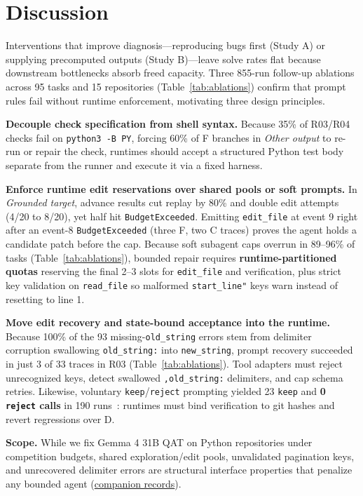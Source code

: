 \section{Discussion}
Interventions that improve diagnosis---reproducing bugs first (Study A) or supplying precomputed outputs (Study B)---leave solve rates flat because downstream bottlenecks absorb freed capacity. Three 855-run follow-up ablations across 95 tasks and 15 repositories (Table~\ref{tab:ablations}) confirm that prompt rules fail without runtime enforcement, motivating three design principles.

\begin{table}[htbp]
\centering\footnotesize\setlength{\tabcolsep}{2.8pt}

\caption{Follow-up prompt-only ablations across 95 tasks from 15 repositories (2,565 runs).}
\label{tab:ablations}
\end{table}

\textbf{Decouple check specification from shell syntax.} Because 35\% of R03/R04 checks fail on \texttt{python3 -B PY}, forcing 60\% of F branches in \emph{Other output} to re-run or repair the check, runtimes should accept a structured Python test body separate from the runner and execute it via a fixed harness.

\textbf{Enforce runtime edit reservations over shared pools or soft prompts.} In \emph{Grounded target}, advance results cut replay by 80\% and double edit attempts (4/20 to 8/20), yet half hit \texttt{BudgetExceeded}. Emitting \texttt{edit\_file} at event 9 right after an event-8 \texttt{BudgetExceeded} (three F, two C traces) proves the agent holds a candidate patch before the cap. Because soft subagent caps overrun in 89--96\% of tasks (Table~\ref{tab:ablations}), bounded repair requires \textbf{runtime-partitioned quotas} reserving the final 2--3 slots for \texttt{edit\_file} and verification, plus strict key validation on \texttt{read\_file} so malformed \texttt{start\_line"} keys warn instead of resetting to line 1.

\textbf{Move edit recovery and state-bound acceptance into the runtime.} Because 100\% of the 93 missing-\texttt{old\_string} errors stem from delimiter corruption swallowing \texttt{old\_string:} into \texttt{new\_string}, prompt recovery succeeded in just 3 of 33 traces in R03 (Table~\ref{tab:ablations}). Tool adapters must reject unrecognized keys, detect swallowed \texttt{,old\_string:} delimiters, and cap schema retries. Likewise, voluntary \texttt{keep}/\texttt{reject} prompting yielded 23 \texttt{keep} and \textbf{0 \texttt{reject} calls} in 190 runs~\cite{genesis}: runtimes must bind verification to git hashes and revert regressions over D.

\textbf{Scope.} While we fix Gemma 4 31B QAT on Python repositories under competition budgets, shared exploration/edit pools, unvalidated pagination keys, and unrecovered delimiter errors are structural interface properties that penalize any bounded agent (\href{supplement/reproducibility.md}{companion records}).
\FloatBarrier
